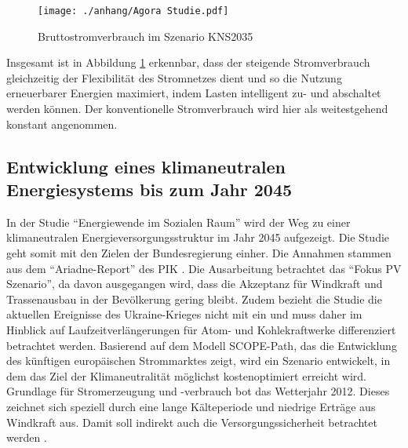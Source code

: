 		\begin{figure} [H]
			\centering
			\label{Abb. Zunahme Flexibilität} 
			\texttt{[image: ./anhang/Agora Studie.pdf]}
			\caption{Bruttostromverbrauch im Szenario KNS2035 \cite[S.33]{Agora_KlimaneutralesStromsystem}}
		\end{figure}
			
		Insgesamt ist in Abbildung \ref{Abb. Zunahme Flexibilität} erkennbar, dass der steigende Stromverbrauch gleichzeitig der Flexibilität des Stromnetzes dient und so die Nutzung erneuerbarer Energien maximiert, indem Lasten intelligent zu- und abschaltet werden können. Der konventionelle Stromverbrauch wird hier als weitestgehend konstant angenommen.
	
	\subsection{Entwicklung eines klimaneutralen Energiesystems bis zum Jahr 2045}
	
		In der Studie "`Energiewende im Sozialen Raum"' wird der Weg zu einer klimaneutralen Energieversorgungsstruktur im Jahr 2045 aufgezeigt.
		Die Studie geht somit mit den Zielen der Bundesregierung einher.
		Die Annahmen stammen aus dem "`Ariadne-Report"' des PIK \cite[S.150]{AriadneReport}.
		Die Ausarbeitung betrachtet das "`Fokus PV Szenario"', da davon ausgegangen wird, dass die Akzeptanz für Windkraft und Trassenausbau in der Bevölkerung gering bleibt.
		Zudem bezieht die Studie die aktuellen Ereignisse des Ukraine-Krieges nicht mit ein und muss daher im Hinblick auf Laufzeitverlängerungen für Atom- und Kohlekraftwerke differenziert betrachtet werden.
		Basierend auf dem Modell SCOPE-Path, das die Entwicklung des künftigen europäischen Strommarktes zeigt, wird ein Szenario entwickelt, in dem das Ziel der Klimaneutralität möglichst kostenoptimiert erreicht wird.
		Grundlage für Stromerzeugung und -verbrauch bot das Wetterjahr 2012. 
		Dieses zeichnet sich speziell durch eine lange Kälteperiode und niedrige Erträge aus Windkraft aus. Damit soll indirekt auch die Versorgungssicherheit betrachtet werden \cite[S.2]{ESRa_Fraunhofer}. \\
		
